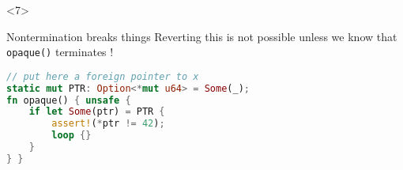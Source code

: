 \begin{frame}[fragile, t]
\begin{onlyenv}
\begin{block}{}
        \end{block}
    \end{onlyenv}

    \begin{onlyenv}<7>
        \begin{block}{Nontermination breaks things}
            \footnotesize Reverting this is not possible unless we know that \texttt{opaque()} terminates !
            \begin{lstlisting}[language=rust, basicstyle=\ttfamily\scriptsize]
// put here a foreign pointer to x
static mut PTR: Option<*mut u64> = Some(_);
fn opaque() { unsafe {
    if let Some(ptr) = PTR {
        assert!(*ptr != 42);
        loop {}
    }
} }
            \end{lstlisting}
        \end{block}
    \end{onlyenv}
\end{frame}

